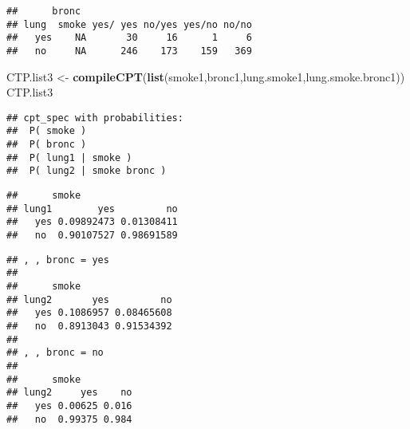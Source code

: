 \documentclass[
]{article}
\newenvironment{Shaded}{\begin{snugshade}}{\end{snugshade}}
\newcommand{\DataTypeTok}[1]{\textcolor[rgb]{0.13,0.29,0.53}{#1}}
\newcommand{\DecValTok}[1]{\textcolor[rgb]{0.00,0.00,0.81}{#1}}
\newcommand{\KeywordTok}[1]{\textcolor[rgb]{0.13,0.29,0.53}{\textbf{#1}}}
\newcommand{\NormalTok}[1]{#1}
\newcommand{\OperatorTok}[1]{\textcolor[rgb]{0.81,0.36,0.00}{\textbf{#1}}}
\newcommand{\StringTok}[1]{\textcolor[rgb]{0.31,0.60,0.02}{#1}}
\begin{document}
\begin{verbatim}
##      bronc
## lung  smoke yes/ yes no/yes yes/no no/no
##   yes    NA       30     16      1     6
##   no     NA      246    173    159   369
\end{verbatim}

\begin{Shaded}
\begin{Highlighting}[]
\NormalTok{CTP.list3 <-}\StringTok{ }\KeywordTok{compileCPT}\NormalTok{(}\KeywordTok{list}\NormalTok{(smoke1,bronc1,lung.smoke1,lung.smoke.bronc1))}
\NormalTok{CTP.list3}
\end{Highlighting}
\end{Shaded}

\begin{verbatim}
## cpt_spec with probabilities:
##  P( smoke )
##  P( bronc )
##  P( lung1 | smoke )
##  P( lung2 | smoke bronc )
\end{verbatim}

\begin{Shaded}
\end{Shaded}

\begin{verbatim}
##      smoke
## lung1        yes         no
##   yes 0.09892473 0.01308411
##   no  0.90107527 0.98691589
\end{verbatim}

\begin{Shaded}
\end{Shaded}

\begin{verbatim}
## , , bronc = yes
## 
##      smoke
## lung2       yes         no
##   yes 0.1086957 0.08465608
##   no  0.8913043 0.91534392
## 
## , , bronc = no
## 
##      smoke
## lung2     yes    no
##   yes 0.00625 0.016
##   no  0.99375 0.984
\end{verbatim}

\begin{Shaded}
\end{Shaded}
\end{document}
